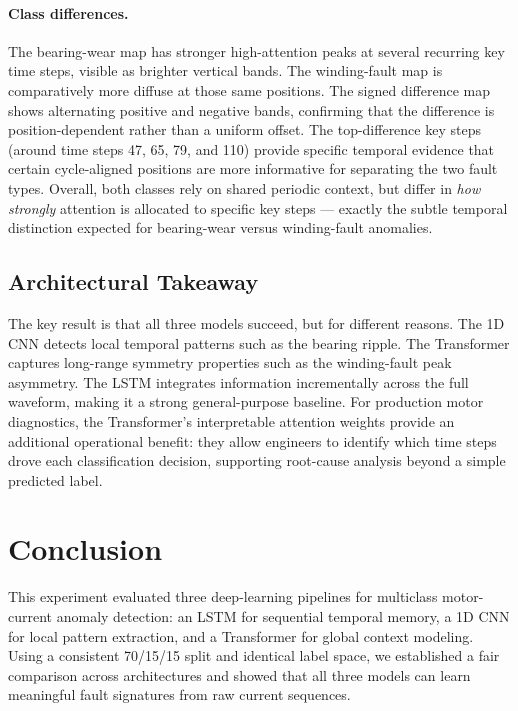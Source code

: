 \documentclass[10pt,twocolumn]{article}
\begin{document}
\paragraph{Class differences.}
The bearing-wear map has stronger high-attention peaks at several recurring key time steps, visible as brighter vertical bands. The winding-fault map is comparatively more diffuse at those same positions. The signed difference map shows alternating positive and negative bands, confirming that the difference is position-dependent rather than a uniform offset. The top-difference key steps (around time steps 47, 65, 79, and 110) provide specific temporal evidence that certain cycle-aligned positions are more informative for separating the two fault types. Overall, both classes rely on shared periodic context, but differ in \emph{how strongly} attention is allocated to specific key steps — exactly the subtle temporal distinction expected for bearing-wear versus winding-fault anomalies.

\subsection{Architectural Takeaway}

The key result is that all three models succeed, but for different reasons. The 1D CNN detects local temporal patterns such as the bearing ripple. The Transformer captures long-range symmetry properties such as the winding-fault peak asymmetry. The LSTM integrates information incrementally across the full waveform, making it a strong general-purpose baseline. For production motor diagnostics, the Transformer's interpretable attention weights provide an additional operational benefit: they allow engineers to identify which time steps drove each classification decision, supporting root-cause analysis beyond a simple predicted label.

\section{Conclusion}

This experiment evaluated three deep-learning pipelines for multiclass motor-current anomaly detection: an LSTM for sequential temporal memory, a 1D CNN for local pattern extraction, and a Transformer for global context modeling. Using a consistent 70/15/15 split and identical label space, we established a fair comparison across architectures and showed that all three models can learn meaningful fault signatures from raw current sequences.
\end{document}
